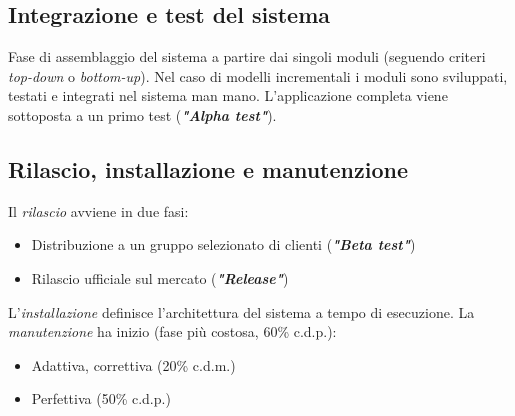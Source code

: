 \subsection{Integrazione e test del sistema}
Fase di assemblaggio del sistema a partire dai singoli moduli (seguendo criteri \textit{top-down} o \textit{bottom-up}). Nel caso di modelli incrementali i moduli sono sviluppati, testati e integrati nel sistema man mano. L'applicazione completa viene sottoposta a un primo test (\textbf{\textit{"Alpha test"}}).

\subsection{Rilascio, installazione e manutenzione}
Il \textit{rilascio} avviene in due fasi:
\begin{itemize}
    \item Distribuzione a un gruppo selezionato di clienti (\textbf{\textit{"Beta test"}})
    \item Rilascio ufficiale sul mercato (\textit{\textbf{"Release"}})
\end{itemize}
L'\textit{installazione} definisce l'architettura del sistema a tempo di esecuzione.
La \textit{manutenzione} ha inizio (fase più costosa, 60\% c.d.p.):
\begin{itemize}
    \item Adattiva, correttiva (20\% c.d.m.)
    \item Perfettiva (50\% c.d.p.)
\end{itemize}

\newpage